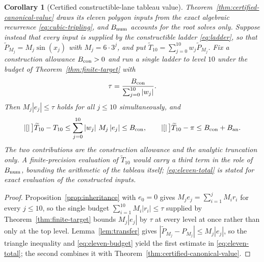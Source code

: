 \documentclass[12pt]{article}
\newtheorem{corollary}[theorem]{Corollary}
\theoremstyle{definition}
\theoremstyle{remark}
\newcommand{\abs}[1]{\left|#1\right|}
\begin{document}
\begin{corollary}[Certified constructible-lane tableau value]
\label{cor:eleven-input}
Theorem~\ref{thm:certified-canonical-value} draws its eleven polygon inputs from
the exact algebraic recurrence \eqref{eq:cubic-tripling}, and $B_{\rm num}$
accounts for the root solves only.  Suppose instead that every input is supplied
by the constructible ladder \eqref{eq:ladder}, so that
$\widetilde P_{M_j}=M_j\sin(\widehat x_j)$ with $M_j=6\cdot3^j$, and put
$\widetilde T_{10}=\sum_{j=0}^{10}w_j\widetilde P_{M_j}$.  Fix a construction
allowance $B_{\rm con}>0$ and run a \emph{single} ladder to level $10$ under the
budget of Theorem~\ref{thm:finite-target} with
\begin{equation}
  \tau=\frac{B_{\rm con}}{\sum_{j=0}^{10}\abs{w_j}}.
  \label{eq:eleven-budget}
\end{equation}
Then $M_j\abs{e_j}\le\tau$ holds for all $j\le10$ simultaneously, and
\begin{equation}
  \abs[\big]{\widetilde T_{10}-T_{10}}
  \le\sum_{j=0}^{10}\abs{w_j}\,M_j\abs{e_j}
  \le B_{\rm con},
  \qquad
  \abs[\big]{\widetilde T_{10}-\pi}\le B_{\rm con}+B_{\rm an}.
  \label{eq:eleven-total}
\end{equation}
The two contributions are the construction allowance and the analytic
truncation only.  A finite-precision \emph{evaluation} of $\widetilde T_{10}$
would carry a third term in the role of $B_{\rm num}$, bounding the arithmetic
of the tableau itself; \eqref{eq:eleven-total} is stated for exact evaluation of
the constructed inputs.
\end{corollary}

\begin{proof}
Proposition~\ref{prop:inheritance} with $e_0=0$ gives
$M_je_j=\sum_{i=1}^{j}M_ir_i$ for every $j\le10$, so the single budget
$\sum_{i=1}^{10}M_i\abs{r_i}\le\tau$ supplied by
Theorem~\ref{thm:finite-target} bounds $M_j\abs{e_j}$ by $\tau$ at every level
at once rather than only at the top level.
Lemma~\ref{lem:transfer} gives
$\abs{\widetilde P_{M_j}-P_{M_j}}\le M_j\abs{e_j}$, so the triangle inequality
and \eqref{eq:eleven-budget} yield the first estimate in
\eqref{eq:eleven-total}; the second combines it with
Theorem~\ref{thm:certified-canonical-value}.
\end{proof}
\end{document}
